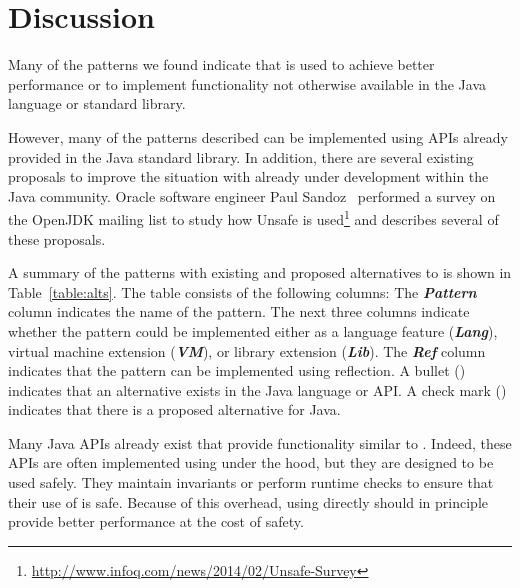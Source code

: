 \section{Discussion}
\label{sec:unsafe:discussions}

Many of the patterns we found indicate that \unsafe{} is used to achieve 
better performance or to implement functionality not otherwise available in the
Java language or standard library.

However, many of the patterns described can be implemented using APIs
already provided in the Java standard library. 
In addition, there are several existing proposals to improve the situation
with \unsafe{} already under development within the Java community.
Oracle software engineer Paul Sandoz~\cite{psandoz14} performed a survey on
the OpenJDK mailing list to
study how Unsafe is
used\footnote{\url{http://www.infoq.com/news/2014/02/Unsafe-Survey}} and
describes several of these proposals.



A summary of the patterns with existing and proposed alternatives to \unsafe{} is shown in Table~\ref{table:alts}.
The table consists of the following columns:
The \textbf{\em Pattern} column indicates the name of the pattern.
The next three columns indicate whether the pattern could be implemented either as a
language feature (\textbf{\em Lang}),
virtual machine extension (\textbf{\em VM}),
or
library extension (\textbf{\em Lib}).
The \textbf{\em Ref} column indicates that the pattern can be
implemented using reflection.
A bullet (\exis) indicates that an
alternative exists in the Java language or API. A check mark (\tick)
indicates that there is a proposed alternative for Java.


Many Java APIs already exist that provide functionality similar to \unsafe{}.
Indeed, these APIs are often implemented using \unsafe{} under the hood, but 
they are designed to be used safely.
They maintain invariants or perform runtime checks
to ensure that their use of \unsafe{} is safe.
Because of this overhead, using \unsafe{}
directly should in principle provide better performance at the cost of safety.


